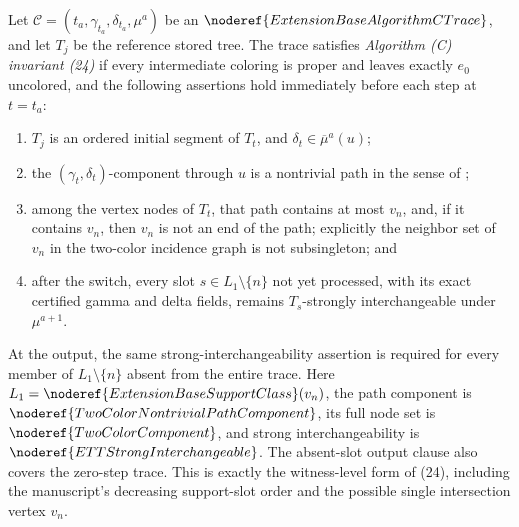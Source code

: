 \begin{definition}
Let
\(\mathcal C=(t_a,\gamma_{t_a},\delta_{t_a},\mu^a)\) be an
\(\noderef{ExtensionBaseAlgorithmCTrace}\), and let \(T_j\) be the
reference stored tree.  The trace satisfies \emph{Algorithm (C)
invariant (24)} if every intermediate coloring is proper and leaves
exactly \(e_0\) uncolored, and the following assertions hold immediately
before each step at \(t=t_a\):
\begin{enumerate}
\item \(T_j\) is an ordered initial segment of \(T_t\), and
      \(\delta_t\in\overline\mu^a(u)\);
\item the \((\gamma_t,\delta_t)\)-component through \(u\) is a nontrivial
      path in the sense of
      ;
\item among the vertex nodes of \(T_t\), that path contains at most
      \(v_n\), and, if it contains \(v_n\), then \(v_n\) is not an end
      of the path; explicitly the neighbor set of \(v_n\) in the
      two-color incidence graph is not subsingleton; and
\item after the switch, every slot
      \(s\in L_1\setminus\{n\}\) not yet processed, with its exact
      certified gamma and delta fields, remains \(T_s\)-strongly
      interchangeable under \(\mu^{a+1}\).
\end{enumerate}
At the output, the same strong-interchangeability assertion is required
for every member of \(L_1\setminus\{n\}\) absent from the entire trace.
Here \(L_1=\noderef{ExtensionBaseSupportClass}(v_n)\), the path component
is \(\noderef{TwoColorNontrivialPathComponent}\), its full node set is
\(\noderef{TwoColorComponent}\), and strong interchangeability is
\(\noderef{ETTStrongInterchangeable}\).  The absent-slot output clause
also covers the zero-step trace.  This is exactly the witness-level form
of (24), including the manuscript's decreasing support-slot order and
the possible single intersection vertex \(v_n\).
\end{definition}
